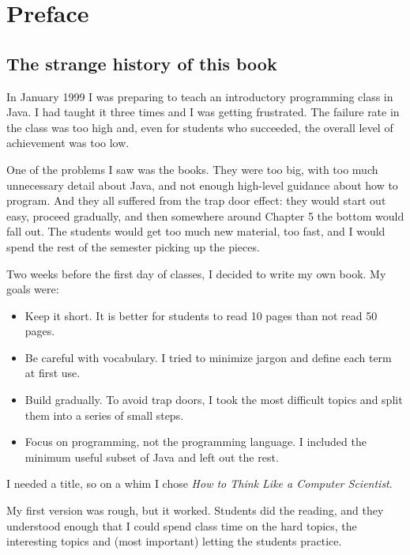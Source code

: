 \documentclass[10pt]{book}
\begin{document}
\chapter{Preface}

\section*{The strange history of this book}

In January 1999 I was preparing to teach an introductory programming
class in Java.  I had taught it three times and I was getting
frustrated.  The failure rate in the class was too high and, even for
students who succeeded, the overall level of achievement was too low.

One of the problems I saw was the books.
They were too big, with too much unnecessary detail about Java, and
not enough high-level guidance about how to program.  And they all
suffered from the trap door effect: they would start out easy,
proceed gradually, and then somewhere around Chapter 5 the bottom would
fall out.  The students would get too much new material, too fast,
and I would spend the rest of the semester picking up the pieces.

Two weeks before the first day of classes, I decided to write my
own book.  My goals were:

\begin{itemize}

\item Keep it short.  It is better for students to read 10 pages
than not read 50 pages.

\item Be careful with vocabulary.  I tried to minimize jargon
and define each term at first use.

\item Build gradually. To avoid trap doors, I took the most difficult
topics and split them into a series of small steps.

\item Focus on programming, not the programming language.  I included
the minimum useful subset of Java and left out the rest.

\end{itemize}

I needed a title, so on a whim I chose {\em How to Think Like
a Computer Scientist}.

My first version was rough, but it worked.  Students did the reading,
and they understood enough that I could spend class time on the hard
topics, the interesting topics and (most important) letting the
students practice.
\end{document}
